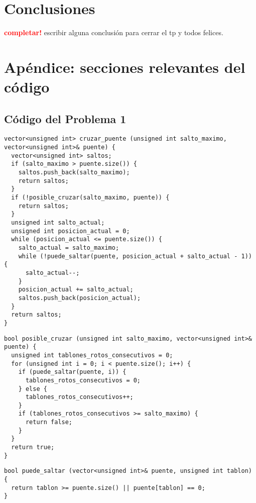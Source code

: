 \documentclass[a4paper]{article}
\begin{document}
\newpage

\section{Conclusiones}
    \textcolor{red}{\textbf{completar!}} \medskip
    escribir alguna conclusión para cerrar el tp y todos felices.

\newpage

\section{Apéndice: secciones relevantes del código}

\subsection{Código del Problema 1}



\begin{lstlisting}
vector<unsigned int> cruzar_puente (unsigned int salto_maximo, vector<unsigned int>& puente) {
  vector<unsigned int> saltos;
  if (salto_maximo > puente.size()) {
    saltos.push_back(salto_maximo);
    return saltos;
  }
  if (!posible_cruzar(salto_maximo, puente)) {
    return saltos;
  }
  unsigned int salto_actual;
  unsigned int posicion_actual = 0;
  while (posicion_actual <= puente.size()) {
    salto_actual = salto_maximo;
    while (!puede_saltar(puente, posicion_actual + salto_actual - 1)) {
      salto_actual--;
    }
    posicion_actual += salto_actual;
    saltos.push_back(posicion_actual);
  }
  return saltos;
}
\end{lstlisting} 

\vspace*{0.5cm}

\begin{lstlisting}
bool posible_cruzar (unsigned int salto_maximo, vector<unsigned int>& puente) {
  unsigned int tablones_rotos_consecutivos = 0;
  for (unsigned int i = 0; i < puente.size(); i++) {
    if (puede_saltar(puente, i)) {
      tablones_rotos_consecutivos = 0;
    } else {
      tablones_rotos_consecutivos++;
    }
    if (tablones_rotos_consecutivos >= salto_maximo) {
      return false;
    }
  }
  return true;
}
\end{lstlisting}

\vspace*{0.5cm}

\begin{lstlisting}
bool puede_saltar (vector<unsigned int>& puente, unsigned int tablon) {
  return tablon >= puente.size() || puente[tablon] == 0;
}
\end{lstlisting}
\end{document}
